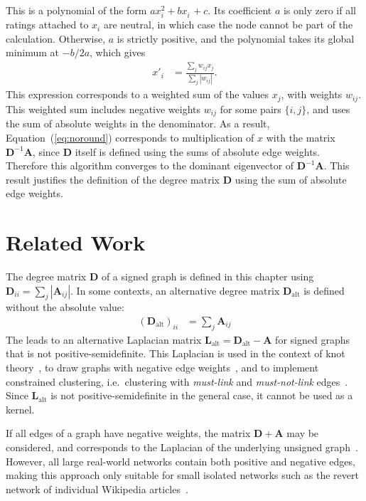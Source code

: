 \documentclass[11pt,a4paper]{book}
\begin{document}
This is a polynomial of the form $ax_i^2 + b x_i^{\phantom 2} +c$.  Its
coefficient $a$
is only zero if all ratings attached to $x_i$ are neutral, in which case
the node cannot be part of the calculation.  Otherwise, $a$ is strictly
positive, and the polynomial takes its global minimum at $-b/2a$, which
gives 
\begin{align}
  x'_i &= \frac{\sum_j w_{ij} x_j}{\sum_j |w_{ij}|}.
  \label{eq:noround}
\end{align}
This expression corresponds to a weighted sum of the values $x_j$, with
weights $w_{ij}$.  This weighted sum includes negative weights $w_{ij}$
for some pairs $\{i,j\}$, and uses the sum of absolute weights in the
denominator.  
As a result, Equation~(\ref{eq:noround}) corresponds to multiplication of
$x$ with the matrix $\mathbf D^{-1}\mathbf A$, since $\mathbf D$ itself
is defined using the sums of absolute edge weights.  Therefore this
algorithm converges 
to the dominant eigenvector of $\mathbf D^{-1}\mathbf A$. 
This result justifies the definition of the degree matrix $\mathbf D$
using the sum of absolute edge weights. 

\section{Related Work}
\label{sec:signed-related}
The degree matrix $\mathbf D$ of a signed graph is defined in this
chapter using $\mathbf D_{ii} = \sum_j |\mathbf A_{ij}|$.  In some
contexts, an alternative degree matrix $\mathbf D_{\mathrm{alt}}$ is defined
without the absolute value:  
\begin{align}
  (\mathbf D_{\mathrm{alt}})_{ii} &= \sum_j \mathbf A_{ij}
\end{align}
The leads to an alternative Laplacian matrix $\mathbf L_{\mathrm{alt}} =
\mathbf D_{\mathrm{alt}}-\mathbf A$ 
for signed graphs that is not positive-semidefinite.
This Laplacian is used in the context of knot theory~\cite{b365}, 
to draw graphs with negative edge weights~\cite{b357}, 
and to implement constrained clustering, i.e.\ clustering with \emph{must-link}
and \emph{must-not-link} edges~\cite{b558}. 
Since $\mathbf L_{\mathrm{alt}}$ is not positive-semidefinite in the general
case, it cannot be used as a kernel. 

If all edges of a graph have negative weights, the matrix $\mathbf
D+\mathbf A$ may be considered, and corresponds to the Laplacian of the
underlying unsigned graph~\cite{b362}.  However, all large real-world
networks contain both positive and negative edges, making this approach
only suitable for small isolated networks such as the revert network of
individual Wikipedia articles~\cite{b390}. 
\end{document}
